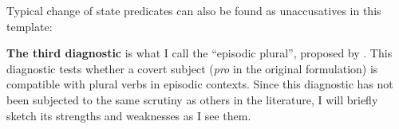 \begin{exe}
\begin{xlist}
\begin{exe}
\begin{xlist}
\begin{exe}
\begin{xlist}
\begin{exe}
\begin{exe}
\begin{xlist}
\begin{exe}
\begin{xlist}
\begin{exe}
\begin{xlist}
\begin{exe}
\begin{xlist}
 \begin{exe}
 \ex  \label{ex:2n9}
 \begin{xlist} 
	
	
	

	
 \z
\z 

Typical change of state predicates can also be found as unaccusatives in this template:
 \begin{exe}
 \ex  
 \begin{xlist} 
	
	
 \z
\z 


\textbf{The third diagnostic} is what I call the ``episodic plural'', proposed by \cite{borer98csli,borer05vol2}. This diagnostic tests whether a covert subject (\emph{pro} in the original formulation) is compatible with plural verbs in episodic contexts. Since this diagnostic has not been subjected to the same scrutiny as others in the literature, I will briefly sketch its strengths and weaknesses as I see them.


\end{xlist}
\end{exe}
\end{xlist}
\end{exe}
\end{xlist}
\end{exe}
\end{xlist}
\end{exe}
\end{xlist}
\end{exe}
\end{xlist}
\end{exe}
\end{exe}
\end{xlist}
\end{exe}
\end{xlist}
\end{exe}
\end{xlist}
\end{exe}
